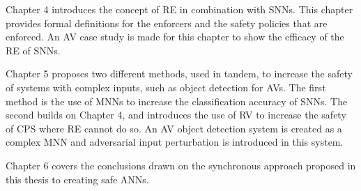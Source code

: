 Chapter 4 introduces the concept of \acf{RE} in combination with \acp{SNN}. 
This chapter provides formal definitions for the enforcers and the safety policies that are enforced.
An \acf{AV} case study is made for this chapter to show the efficacy of the \ac{RE} of \acp{SNN}.

Chapter 5 proposes two different methods, used in tandem, to increase the safety of systems with complex inputs, such as object detection for \acp{AV}.
The first method is the use of \acp{MNN} to increase the classification accuracy of \acp{SNN}.
The second builds on Chapter 4, and introduces the use of \acf{RV} to increase the safety of \ac{CPS} where \acf{RE} cannot do so.
An \acf{AV} object detection system is created as a complex \ac{MNN} and adversarial input perturbation is introduced in this system.

Chapter 6 covers the conclusions drawn on the synchronous approach proposed in this thesis to creating safe \acp{ANN}.

